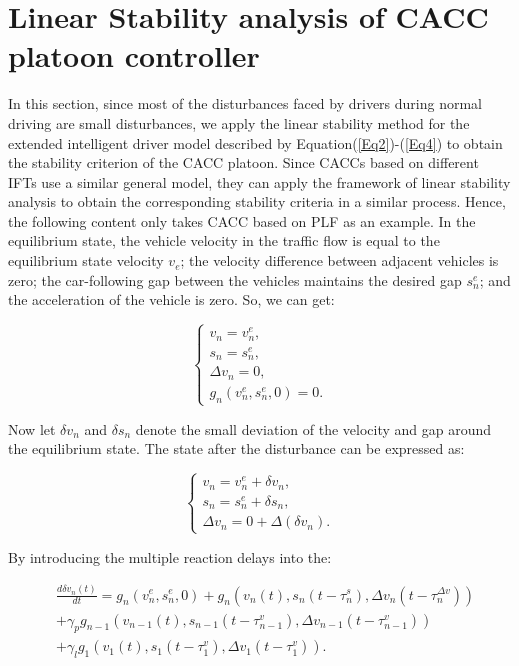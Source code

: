 \documentclass[journal]{IEEEtran}
\begin{document}
\section{Linear Stability analysis of CACC platoon controller}
\label{Section 4}
In this section, since most of the disturbances faced by drivers during normal driving are small disturbances, we apply the linear stability method for the extended intelligent driver model described by Equation(\ref{Eq2})-(\ref{Eq4}) to obtain the stability criterion of the CACC platoon.\citep{jin2014dynamics}\citep{sun2018stability} Since CACCs based on different IFTs use a similar general model, they can apply the framework of linear stability analysis to obtain the corresponding stability criteria in a similar process. Hence, the following content only takes CACC based on PLF as an example.
In the equilibrium state, the vehicle velocity in the traffic flow is equal to the equilibrium state velocity $v_e$; the velocity difference between adjacent vehicles is zero; the car-following gap between the vehicles maintains the desired gap $s_n^e$; and the acceleration of the vehicle is zero. So, we can get:

\begin{equation}
\left\{\begin{array}{c}
v_{n}=v_{n}^{e}, \\
s_{n}=s_{n}^{e}, \\
\Delta v_{n}=0, \\
g_{n}\left(v_{n}^{e}, s_{n}^{e}, 0\right)=0.
\end{array}\right.
\label{Eq5}
\end{equation}

Now let $\delta v_n$ and $\delta s_n$ denote the small deviation of the velocity and gap around the equilibrium state. The state after the disturbance can be expressed as:

\begin{equation}
\left\{\begin{array}{l}
v_{n}=v_{n}^{e}+\delta v_{n}, \\
s_{n}=s_{n}^{e}+\delta s_{n}, \\
\Delta v_{n}=0+\Delta\left(\delta v_{n}\right).
\end{array}\right.
\label{Eq6}
\end{equation}

By introducing the multiple reaction delays into the:

\begin{equation}
\begin{aligned}
&\frac{d \delta v_{n}(t)}{d t}=g_{n}\left(v_{n}^{e}, s_{n}^{e}, 0\right)+g_{n}\left(v_{n}(t), s_{n}\left(t-\tau_{n}^{s}\right), \Delta v_{n}\left(t-\tau_{n}^{\Delta v}\right)\right) \\
&+\gamma_{p} g_{n-1}\left(v_{n-1}(t), s_{n-1}\left(t-\tau_{n-1}^{v}\right), \Delta v_{n-1}\left(t-\tau_{n-1}^{v}\right)\right) \\
&+\gamma_{l} g_{1}\left(v_{1}(t), s_{1}\left(t-\tau_{1}^{v}\right), \Delta v_{1}\left(t-\tau_{1}^{v}\right)\right).
\end{aligned}
\label{Eq7}
\end{equation}
\end{document}
